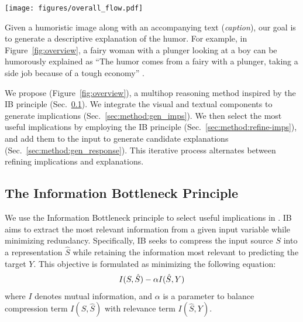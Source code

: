\begin{figure*}[t]
  \texttt{[image: figures/overall\_flow.pdf]} \hfill
  \vspace{-8pt}
  \caption {Overview of \method{}. We begin by generating descriptions, implications, and a candidate explanation (steps 1 and 2). Then, we refine the implications and candidate explanations over $h$ iterations using the IB principle (steps 3 to 5), ultimately generating a final explanation from the refined implications and candidate explanations (step 6).}
  \label{fig:overview}
\end{figure*}

Given a humoristic image along with an accompanying text (\textit{caption}), our goal is to generate a descriptive explanation of the humor. For example, in Figure~\ref{fig:overview}, a fairy woman with a plunger looking at a boy can be humorously explained as ``The humor comes from a fairy with a plunger, taking a side job because of a tough economy'' \cite[from the NewYorker dataset;][]{hessel-etal-2023-androids}.

We propose \method{} (Figure~\ref{fig:overview}), a multihop reasoning method inspired by the IB principle (Sec.~\ref{sec:ib}).
We integrate the visual and textual components to generate implications (Sec.~\ref{sec:method:gen_imps}). We then select the most useful implications by employing the IB principle (Sec.~\ref{sec:method:refine-imps}), and add them to the input to generate candidate explanations  (Sec.~\ref{sec:method:gen_response}). This iterative process alternates between refining implications and explanations.

\subsection{The Information Bottleneck Principle}
\label{sec:ib}

We use the Information Bottleneck principle \cite[IB;][]{ib} to select useful implications in \method{}.
IB aims to extract the most relevant information from a given input variable while minimizing redundancy. Specifically, IB seeks to compress the input source $S$ into a representation $\hat{S}$ while retaining the information most relevant to predicting the target $Y$. This objective is formulated as minimizing the following equation:
\begin{align}
    \notag
    I(S, \hat{S}) - \alpha I(\hat{S}, Y)
\end{align}
where $I$ denotes mutual information, and $\alpha$ is a parameter to balance compression term $I(S, \hat{S})$ with relevance term $I(\hat{S}, Y)$.

